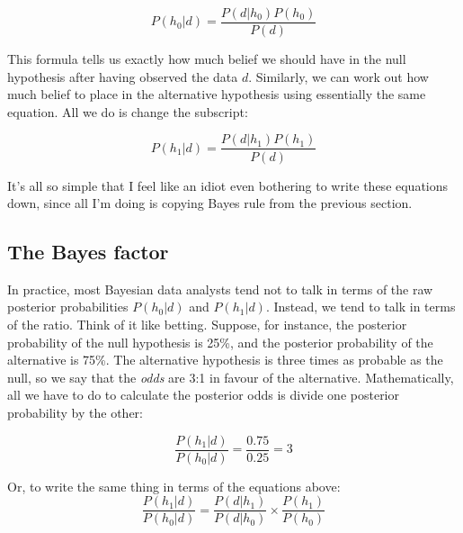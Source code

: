 $$
P(h_0 | d) = \frac{P(d|h_0) P(h_0)}{P(d)}
$$

\noindent
This formula tells us exactly how much belief we should have in the null hypothesis after having observed the data $d$. Similarly, we can work out how much belief to place in the alternative hypothesis using essentially the same equation. All we do is change the subscript:

$$
P(h_1 | d) = \frac{P(d|h_1) P(h_1)}{P(d)}
$$

\noindent
It's all so simple that I feel like an idiot even bothering to write these equations down, since all I'm doing is copying Bayes rule from the previous section.



\subsection{The Bayes factor}

In practice, most Bayesian data analysts tend not to talk in terms of the raw posterior probabilities $P(h_0|d)$ and $P(h_1|d)$. Instead, we tend to talk in terms of the  ratio. Think of it like betting. Suppose, for instance, the posterior probability of the null hypothesis is 25\%, and the posterior probability of the alternative is 75\%. The alternative hypothesis is three times as probable as the null, so we say that the {\it odds} are 3:1 in favour of the alternative. Mathematically, all we have to do to calculate the posterior odds is divide one posterior probability by the other:

$$
\frac{P(h_1 | d)}{P(h_0 | d)} = \frac{0.75}{0.25} = 3
$$

\noindent
Or, to write the same thing in terms of the equations above:
$$
\frac{P(h_1 | d)}{P(h_0 | d)} = \frac{P(d|h_1)}{P(d|h_0)} \times \frac{P(h_1)}{P(h_0)}
$$

